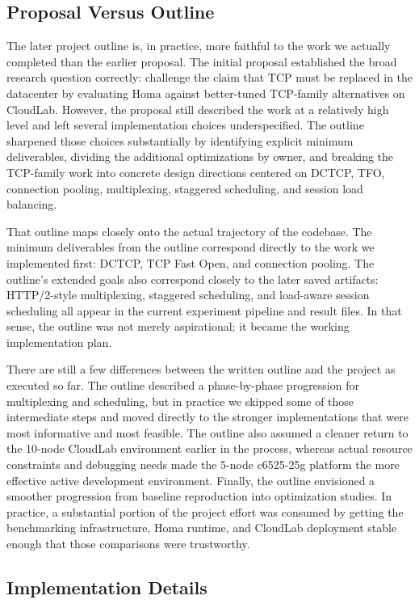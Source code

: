 \documentclass[11pt]{article}
\begin{document}
\subsection{Proposal Versus Outline}

The later project outline is, in practice, more faithful to the work we actually completed than the earlier proposal. The initial proposal established the broad research question correctly: challenge the claim that TCP must be replaced in the datacenter by evaluating Homa against better-tuned TCP-family alternatives on CloudLab. However, the proposal still described the work at a relatively high level and left several implementation choices underspecified. The outline sharpened those choices substantially by identifying explicit minimum deliverables, dividing the additional optimizations by owner, and breaking the TCP-family work into concrete design directions centered on DCTCP, TFO, connection pooling, multiplexing, staggered scheduling, and session load balancing.

That outline maps closely onto the actual trajectory of the codebase. The minimum deliverables from the outline correspond directly to the work we implemented first: DCTCP, TCP Fast Open, and connection pooling. The outline's extended goals also correspond closely to the later saved artifacts: HTTP/2-style multiplexing, staggered scheduling, and load-aware session scheduling all appear in the current experiment pipeline and result files. In that sense, the outline was not merely aspirational; it became the working implementation plan.

There are still a few differences between the written outline and the project as executed so far. The outline described a phase-by-phase progression for multiplexing and scheduling, but in practice we skipped some of those intermediate steps and moved directly to the stronger implementations that were most informative and most feasible. The outline also assumed a cleaner return to the 10-node CloudLab environment earlier in the process, whereas actual resource constraints and debugging needs made the 5-node c6525-25g platform the more effective active development environment. Finally, the outline envisioned a smoother progression from baseline reproduction into optimization studies. In practice, a substantial portion of the project effort was consumed by getting the benchmarking infrastructure, Homa runtime, and CloudLab deployment stable enough that those comparisons were trustworthy.

\subsection{Implementation Details}
\end{document}
